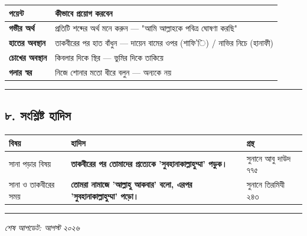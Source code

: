 \begin{table}[h]\centering\small
\begin{tabular}{ll}
পয়েন্ট & কীভাবে প্রয়োগ করবেন \\
\hline
\textbf{গভীর অর্থ} & প্রতিটি শব্দের অর্থ মনে করুন — "আমি আল্লাহকে পবিত্র ঘোষণা করছি" \\
\textbf{হাতের অবস্থান} & তাকবীরের পর হাত বাঁধুন — দায়েন বামের ওপর (শাফি'ি) / নাভির নিচে (হানাফী) \\
\textbf{চোখের অবস্থান} & কিবলার দিকে স্থির — ভুমির দিকে তাকিয়ে \\
\textbf{গলার স্বর} & নিজে শোনার মতো ধীরে বলুন — অন্যকে নয় \\
\hline
\end{tabular}
\end{table}

\medskip\hrule\medskip

\subsection*{৮. সংশ্লিষ্ট হাদিস}

\begin{table}[h]\centering\small
\begin{tabular}{lll}
বিষয় & হাদিস & গ্রন্থ \\
\hline
সানা পড়ার বিষয় & \textbf{\lat{“}তাকবীরের পর তোমাদের প্রত্যেকে 'সুবহানাকাল্লাহুম্মা' পড়ুক।\lat{”}} & সুনানে আবু দাউদ ৭৭৫ \\
সানা ও তাকবীরের সময় & \textbf{\lat{“}তোমরা নামাজে 'আল্লাহু আকবার' বলো, এরপর 'সুবহানাকাল্লাহুম্মা' পড়ো।\lat{”}} & সুনানে তিরমিযী ২৪৩ \\
\hline
\end{tabular}
\end{table}

\medskip\hrule\medskip

\textit{শেষ আপডেট: আগস্ট ২০২৬}



